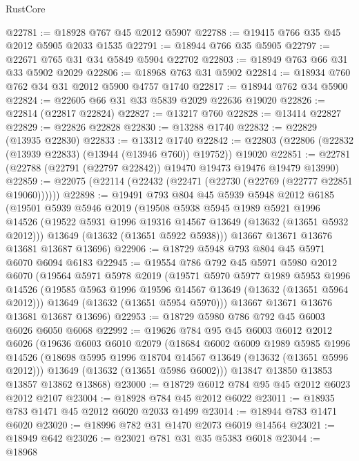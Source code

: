 \begin{lexlean}{RustCore}
\begin{coremodule}
@22781 := @18928 @767 @45 @2012 @5907
@22788 := @19415 @766 @35 @45 @2012 @5905 @2033 @1535
@22791 := @18944 @766 @35 @5905
@22797 := @22671 @765 @31 @34 @5849 @5904 @22702
@22803 := @18949 @763 @66 @31 @33 @5902 @2029
@22806 := @18968 @763 @31 @5902
@22814 := @18934 @760 @762 @34 @31 @2012 @5900 @4757 @1740
@22817 := @18944 @762 @34 @5900
@22824 := @22605 @66 @31 @33 @5839 @2029 @22636 @19020
@22826 := @22814 (@22817 @22824)
@22827 := @13217 @760
@22828 := @13414 @22827
@22829 := @22826 @22828
@22830 := @13288 @1740
@22832 := @22829 (@13935 @22830)
@22833 := @13312 @1740
@22842 := @22803 (@22806 (@22832 (@13939 @22833) (@13944 (@13946 @760)) @19752)) @19020
@22851 := @22781 (@22788 (@22791 (@22797 @22842)) @19470 @19473 @19476 @19479 @13990)
@22859 := @22075 (@22114 (@22432 (@22471 (@22730 (@22769 (@22777 @22851 @19060))))))
@22898 := @19491
    @793
    @804
    @45
    @5939
    @5948
    @2012
    @6185
    (@19501
      @5939
      @5946
      @2019
      (@19508
        @5938
        @5945
        @1989
        @5921
        @1996
        @14526
        (@19522 @5931 @1996 @19316 @14567 @13649 (@13632 (@13651 @5932 @2012)))
        @13649
        (@13632 (@13651 @5922 @5938)))
      @13667
      @13671
      @13676
      @13681
      @13687
      @13696)
@22906 := @18729 @5948 @793 @804 @45 @5971 @6070 @6094 @6183
@22945 := @19554
    @786
    @792
    @45
    @5971
    @5980
    @2012
    @6070
    (@19564
      @5971
      @5978
      @2019
      (@19571
        @5970
        @5977
        @1989
        @5953
        @1996
        @14526
        (@19585 @5963 @1996 @19596 @14567 @13649 (@13632 (@13651 @5964 @2012)))
        @13649
        (@13632 (@13651 @5954 @5970)))
      @13667
      @13671
      @13676
      @13681
      @13687
      @13696)
@22953 := @18729 @5980 @786 @792 @45 @6003 @6026 @6050 @6068
@22992 := @19626
    @784
    @95
    @45
    @6003
    @6012
    @2012
    @6026
    (@19636
      @6003
      @6010
      @2079
      (@18684
        @6002
        @6009
        @1989
        @5985
        @1996
        @14526
        (@18698 @5995 @1996 @18704 @14567 @13649 (@13632 (@13651 @5996 @2012)))
        @13649
        (@13632 (@13651 @5986 @6002)))
      @13847
      @13850
      @13853
      @13857
      @13862
      @13868)
@23000 := @18729 @6012 @784 @95 @45 @2012 @6023 @2012 @2107
@23004 := @18928 @784 @45 @2012 @6022
@23011 := @18935 @783 @1471 @45 @2012 @6020 @2033 @1499
@23014 := @18944 @783 @1471 @6020
@23020 := @18996 @782 @31 @1470 @2073 @6019 @14564
@23021 := @18949 @642
@23026 := @23021 @781 @31 @35 @5383 @6018
@23044 := @18968

\end{coremodule}
\end{lexlean}
